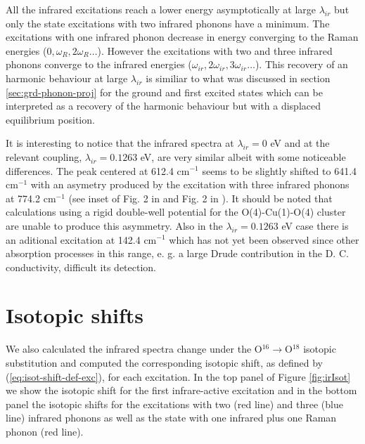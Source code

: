 All the infrared excitations reach a lower energy asymptotically at large $\lambda_{ir}$ but only the state excitations with two infrared phonons have a minimum.
The excitations with one infrared phonon decrease in energy converging to the Raman energies ($0,\omega_R,2\omega_R\ldots$).
However the excitations with two and three infrared phonons converge to the infrared energies ($\omega_{ir},2\omega_{ir},3\omega_{ir}\ldots$).
This recovery of an harmonic behaviour at large $\lambda_{ir}$ is similiar to what was discussed in section \ref{sec:grd-phonon-proj} for the ground and first excited states which can be interpreted as a recovery of the harmonic behaviour but with a displaced equilibrium position.

It is interesting to notice that the infrared spectra at $\lambda_{ir}=0$ eV and at the relevant coupling, $\lambda_{ir}=0.1263$ eV, are very similar albeit with some noticeable differences.
The peak centered at 612.4 cm$^{-1}$ seems to be slightly shifted to 641.4 cm$^{-1}$ with an asymetry produced by the excitation with three infrared phonons at 774.2 cm$^{-1}$ (see inset of Fig. 2 in \cite{MustredeLeon1992} and Fig. 2 in \cite{Salkola1994}).
It should be noted that calculations using a rigid double-well potential for the O(4)-Cu(1)-O(4) cluster are unable to produce this asymmetry.
Also in the $\lambda_{ir}=0.1263$ eV case there is an aditional excitation at 142.4 cm$^{-1}$ which has not yet been observed since other absorption processes in this range, e. g. a large Drude contribution in the D. C. conductivity, difficult its detection.

\section{Isotopic shifts}
\label{sec:irIsotopicShifts}

We also calculated the infrared spectra change under the O$^{16}\rightarrow$O$^{18}$ isotopic substitution and computed the corresponding isotopic shift, as defined by (\ref{eq:isot-shift-def-exc}), for each excitation.
In the top panel of Figure \ref{fig:irIsot} we show the isotopic shift for the first infrare-active excitation and in the bottom panel the isotopic shifts for the excitations with two (red line) and three (blue line) infrared phonons as well as the state with one infrared plus one Raman phonon (red line).

